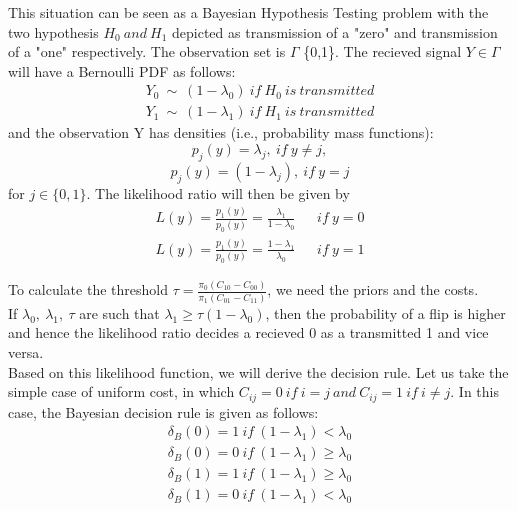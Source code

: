 \documentclass[a4paper,english,12pt]{article}
\begin{document}
\begin{exmp}
This situation can be seen as a Bayesian Hypothesis Testing problem with the two hypothesis $ H_0~ and~ H_1 $ depicted as transmission of a "zero" and transmission of a "one" respectively. The observation set is $\Gamma$ \{0,1\}. The recieved signal $Y \in \Gamma$  will have a Bernoulli PDF as follows:\\
\begin{eqnarray}
Y_{0}~\sim~\left( 1-\lambda_{0}\right) ~if~H_0~is~transmitted\\
Y_{1}~\sim~\left( 1-\lambda_{1}\right)~if~H_1~is~transmitted \end{eqnarray}
and the observation Y has densities (i.e., probability mass functions):
\begin{equation}
p_{j}\left( y\right) = \lambda_{j} ,~if~ y\neq j,
\end{equation}
\begin{equation}
p_{j}\left( y\right) = \left( 1-\lambda_{j}\right),~if~ y=j
\end{equation}
for $j \in \{0,1\}$.
The likelihood ratio will then be given by \\
\begin{eqnarray}
L(y) = \frac{p_1(y)}{p_0(y)} = \frac{\lambda_1}{1-\lambda_0} ~~~~~~~if~ y=0 \\
L(y) = \frac{p_1(y)}{p_0(y)} = \frac{1-\lambda_1}{\lambda_0} ~~~~~~~if~ y=1
\end{eqnarray}

To calculate the threshold $\tau= \frac{\pi_0(C_{10}-C_{00})}{\pi_1(C_{01}-C_{11})}$, we need the priors and the costs. \\
If $\lambda_0,~\lambda_1,~\tau$  are such that $\lambda_1\geq \tau\left( 1-\lambda_0\right) $, then the probability of a flip is higher and hence the likelihood ratio decides a recieved 0 as a transmitted 1 and vice versa.\\
Based on this likelihood function, we will derive the decision rule. Let us take the simple case of uniform cost, in which $C_{ij} = 0~ if~ i=j~ and~ C_{ij} = 1~ if ~i\neq j$. In this case, the Bayesian decision rule is given as follows:\\
\begin{eqnarray}
\delta_{B}(0)=1~if~(1-\lambda_1)<\lambda_0\\ 
\delta_{B}(0)=0~if~(1-\lambda_1)\geq\lambda_0
\end{eqnarray}
\begin{eqnarray}
\delta_{B}(1)=1~if~(1-\lambda_1)\geq\lambda_0\\
\delta_{B}(1)=0~if~(1-\lambda_1)<\lambda_0
\end{eqnarray}


\end{exmp}
\end{document}
